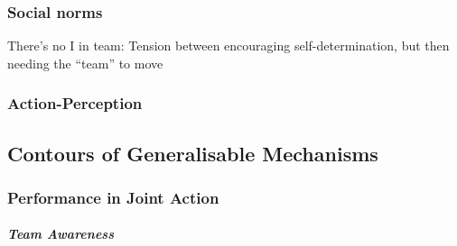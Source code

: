     \subsubsection{Social norms}

    There's no I in team:
    Tension between encouraging self-determination, but then needing the ``team'' to move







    \subsubsection{Action-Perception}








  \subsection{Contours of Generalisable Mechanisms}

    \subsubsection{Performance in Joint Action}


          \subparagraph{Team Awareness}

